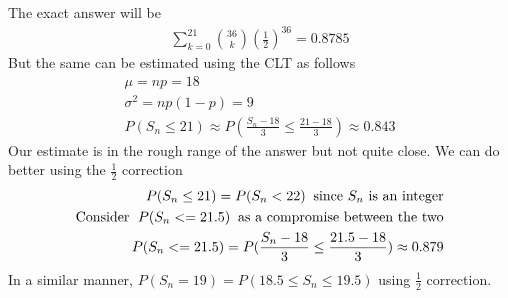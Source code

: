 \documentclass[../../probability-notes.tex]{subfile}
\begin{document}
        The exact answer will be
        \begin{align*}
            \sum_{k=0}^{21}\binom{36}{k}(\frac{1}{2})^{36} = 0.8785
        \end{align*}
        But the same can be estimated using the CLT as follows
        \begin{align*}
            \mu = np = 18\\
            \sigma^{2} = np(1-p) = 9\\
            P(S_{n} \leq 21) \approx P(\frac{S_{n} - 18}{3} \leq \frac{21-18}{3}) \approx 0.843
        \end{align*}
        Our estimate is in the rough range of the answer but not quite close. We can do better using the $\frac{1}{2}$ correction
        \begin{align*}
            P(S_{n} \leq 21) = P(S_{n} < 22) \text{\;\;since $S_{n}$ is an integer}\\
            \text{Consider \;}P(S_{n} <= 21.5) \text{\;\;as a compromise between the two}\\
            P(S_{n} <= 21.5) = P(\frac{S_{n} - 18}{3} \leq \frac{21.5 - 18}{3}) \approx 0.879
        \end{align*}
        In a similar manner, $P(S_{n}=19) = P(18.5 \leq S_{n} \leq 19.5)$ using $\frac{1}{2}$ correction.
\end{document}

